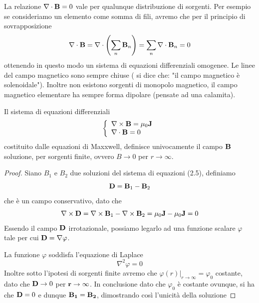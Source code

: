 La relazione $\nabla \cdot \bold{B} = 0$ vale per qualunque distribuzione di sorgenti. Per esempio se consideriamo un elemento come somma di fili, avremo che per il principio di sovrapposizione
\begin{equation*}
	\nabla \cdot \bold{B} = \nabla \cdot \left (\sum_{n} \bold{B}_{n}\right ) = \sum_{n} \nabla \cdot \bold{B}_n =0
\end{equation*}
ottenendo in questo modo un sistema di equazioni differenziali omogenee. Le linee del campo magnetico sono sempre chiuse ( si dice che: "il campo magnetico \`e solenoidale"). Inoltre non esistono sorgenti di monopolo magnetico, il campo magnetico elementare ha sempre forma dipolare (pensate ad una calamita).

\begin{theorem}
	Il sistema di equazioni differenziali 
	\begin{equation}
		\left \{ \begin{array}{l}
			\nabla \times \bold{B} = \mu_0 \bold{J} \\
			\nabla \cdot \bold{B} = 0
		\end{array}\right.
	\end{equation}
costituito dalle equazioni di Maxxwell, definisce univocamente il campo $\bold{B}$ soluzione, per sorgenti finite, ovvero $B \to 0$ per $r \to \infty$.
\end{theorem}
\begin{proof}
	Siano $B_1$ e $B_2$ due soluzioni del sistema di equazioni (2.5), definiamo
	\begin{equation*}
		\bold{D} = \bold{B}_{1} - \bold{B}_2
	\end{equation*}
che \`e un campo conservativo, dato che 
\begin{equation*}
	\nabla \times \bold{D} = \nabla \times \bold{B}_1 - \nabla \times \bold{B}_2 = \mu_0\bold{J} -\mu_0 \bold{J} =0
\end{equation*}
Essendo il campo $\bold{D}$ irrotazionale, possiamo legarlo ad una funzione scalare $\varphi$ tale per cui $\bold{D} = \nabla \varphi$.

La funzione $\varphi$ soddisfa l'equazione di Laplace 
\begin{equation*}
	\nabla^2 \varphi =0
\end{equation*}
Inoltre sotto l'ipotesi di sorgenti finite avremo che $\varphi(r)|_{r \to \infty} = \varphi_0$ costante, dato che $\bold{D} \to 0 $ per $\bold{r} \to \infty$. In conclusione dato che $\varphi_0$ \`e costante ovunque, si ha che $\bold{D}=0$ e dunque $\bold{B_1} =\bold{B_2}$, dimostrando cos\`i l'unicit\`a della soluzione

\end{proof}

